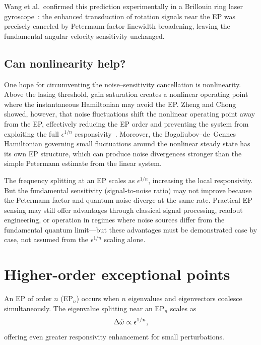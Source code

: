Wang et al.\ confirmed this prediction experimentally in a Brillouin
ring laser gyroscope~\cite{wang2020petermann}: the enhanced transduction
of rotation signals near the EP was precisely canceled by
Petermann-factor linewidth broadening, leaving the fundamental angular
velocity sensitivity unchanged.

\subsection{Can nonlinearity help?}
\label{ssec:ep-nonlinear-sensing}

One hope for circumventing the noise--sensitivity cancellation is
nonlinearity. Above the lasing threshold, gain saturation creates a
nonlinear operating point where the instantaneous Hamiltonian may avoid
the EP. Zheng and Chong showed, however, that noise fluctuations shift
the nonlinear operating point away from the EP, effectively reducing the
EP order and preventing the system from exploiting the full $\epsilon^{1/n}$
responsivity~\cite{zheng2024noise}. Moreover, the Bogoliubov--de~Gennes
Hamiltonian governing small fluctuations around the nonlinear steady state
has its own EP structure, which can produce noise divergences stronger
than the simple Petermann estimate from the linear system.

\begin{takeaway}
The frequency splitting at an EP scales as $\epsilon^{1/n}$, increasing
the local responsivity. But the fundamental sensitivity
(signal-to-noise ratio) may not improve because the Petermann factor and
quantum noise diverge at the same rate. Practical EP sensing may still
offer advantages through classical signal processing, readout
engineering, or operation in regimes where noise sources differ from the
fundamental quantum limit---but these advantages must be demonstrated
case by case, not assumed from the $\epsilon^{1/n}$ scaling alone.
\end{takeaway}


\section{Higher-order exceptional points}
\label{sec:higher-ep}

An EP of order $n$ (EP$_n$) occurs when $n$ eigenvalues and eigenvectors
coalesce simultaneously. The eigenvalue splitting near an EP$_n$ scales as
\begin{equation}
 \Delta\tilde{\omega} \propto \epsilon^{1/n},
 \label{eq:epn-response}
\end{equation}
offering even greater responsivity enhancement for small perturbations.

